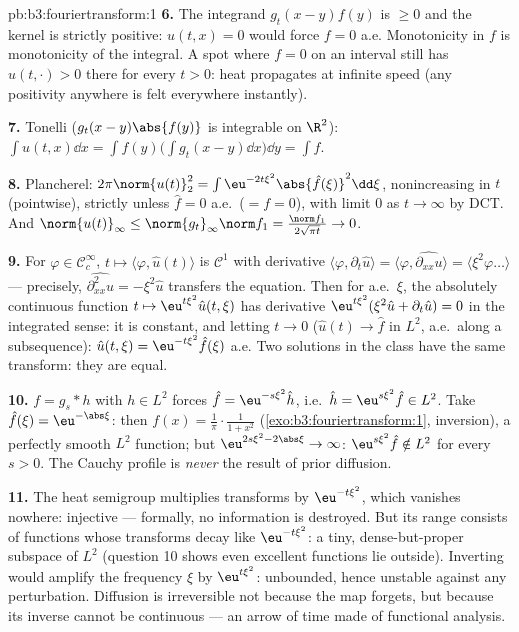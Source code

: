 \begin{solution}{pb:b3:fouriertransform:1}
\textbf{6.} The integrand $g_t(x-y)f(y)$ is $\geq 0$ and the
kernel is strictly positive: $u(t,x) = 0$ would force $f = 0$
a.e. Monotonicity in $f$ is monotonicity of the integral. A
spot where $f = 0$ on an interval still has $u(t, \cdot) > 0$
there for every $t > 0$: heat propagates at infinite speed
(any positivity anywhere is felt everywhere instantly).

\textbf{7.} Tonelli ($g_t(x-y)\abs{f(y)}$ is integrable on
$\R^2$): $\int u(t,x)\dd x = \int f(y)\bigl(\int g_t(x -
y)\dd x\bigr)\dd y = \int f$.

\textbf{8.} Plancherel: $2\pi\norm{u(t)}_2^2 =
\int\eu^{-2t\xi^2}\abs{\hat f(\xi)}^2\dd\xi$, nonincreasing in
$t$ (pointwise), strictly unless $\hat f = 0$ a.e.\ ($= f =
0$), with limit $0$ as $t\to\infty$ by DCT. And
$\norm{u(t)}_\infty \leq \norm{g_t}_\infty\norm f_1 =
\frac{\norm f_1}{2\sqrt{\pi t}} \to 0$.

\textbf{9.} For $\varphi \in \mathcal C_c^\infty$, $t \mapsto
\langle\varphi, \hat u(t)\rangle$ is $\mathcal C^1$ with
derivative $\langle\varphi, \partial_t\hat u\rangle =
\langle\varphi, \widehat{\partial_{xx}u}\rangle =
\langle\xi^2\varphi\dots\rangle$ --- precisely,
$\widehat{\partial^2_{xx}u} = -\xi^2\hat u$ transfers the
equation. Then for a.e.\ $\xi$, the absolutely continuous
function $t \mapsto \eu^{t\xi^2}\hat u(t,\xi)$ has derivative
$\eu^{t\xi^2}(\xi^2\hat u + \partial_t\hat u) = 0$ in the
integrated sense: it is constant, and letting $t \to 0$
($\hat u(t) \to \hat f$ in $L^2$, a.e.\ along a subsequence):
$\hat u(t, \xi) = \eu^{-t\xi^2}\hat f(\xi)$ a.e. Two
solutions in the class have the same transform: they are
equal.

\textbf{10.} $f = g_s * h$ with $h \in L^2$ forces $\hat f =
\eu^{-s\xi^2}\hat h$, i.e.\ $\hat h = \eu^{s\xi^2}\hat f \in
L^2$. Take $\hat f(\xi) = \eu^{-\abs\xi}$: then $f(x) =
\frac1\pi\cdot\frac1{1 + x^2}$
(\cref{exo:b3:fouriertransform:1}, inversion), a perfectly
smooth $L^2$ function; but $\eu^{2s\xi^2 - 2\abs\xi} \to
\infty$: $\eu^{s\xi^2}\hat f \notin L^2$ for every $s > 0$.
The Cauchy profile is \emph{never} the result of prior
diffusion.

\textbf{11.} The heat semigroup multiplies transforms by
$\eu^{-t\xi^2}$, which vanishes nowhere: injective ---
formally, no information is destroyed. But its range consists
of functions whose transforms decay like $\eu^{-t\xi^2}$: a
tiny, dense-but-proper subspace of $L^2$ (question 10 shows
even excellent functions lie outside). Inverting would
amplify the frequency $\xi$ by $\eu^{t\xi^2}$: unbounded,
hence unstable against any perturbation. Diffusion is
irreversible not because the map forgets, but because its
inverse cannot be continuous --- an arrow of time made of
functional analysis.


\end{solution}

